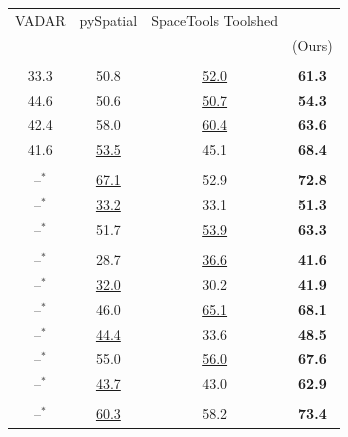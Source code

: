 \begin{table}[t]
{  \begin{tabular}[t]{cccc}
  \toprule
  \rowcolor{white}VADAR                       & pySpatial                & SpaceTools Toolshed                          & \ours{} \\
  \rowcolor{white}\citep{marsili2025visual}   & \citep{luo2026pyspatial} & \citep{chen2025spacetools} & (Ours)  \\
  \midrule
  \multicolumn{4}{c}{\strut} \\
  33.3 & 50.8 & \cellcolor{secondcell}\underline{52.0} & \cellcolor{bestcell}\textbf{61.3} \\
  44.6 & 50.6 & \cellcolor{secondcell}\underline{50.7} & \cellcolor{bestcell}\textbf{54.3} \\
  42.4 & 58.0 & \cellcolor{secondcell}\underline{60.4} & \cellcolor{bestcell}\textbf{63.6} \\
  41.6 & \cellcolor{secondcell}\underline{53.5} & 45.1 & \cellcolor{bestcell}\textbf{68.4} \\
  \midrule
  \multicolumn{4}{c}{\strut} \\
  --$^{*}$ & \cellcolor{secondcell}\underline{67.1} & 52.9 & \cellcolor{bestcell}\textbf{72.8} \\
  --$^{*}$ & \cellcolor{secondcell}\underline{33.2} & 33.1 & \cellcolor{bestcell}\textbf{51.3} \\
  --$^{*}$ & 51.7 & \cellcolor{secondcell}\underline{53.9} & \cellcolor{bestcell}\textbf{63.3} \\
  \midrule
  \multicolumn{4}{c}{\strut} \\
  --$^{*}$ & 28.7 & \cellcolor{secondcell}\underline{36.6} & \cellcolor{bestcell}\textbf{41.6} \\
  --$^{*}$ & \cellcolor{secondcell}\underline{32.0} & 30.2 & \cellcolor{bestcell}\textbf{41.9} \\
  --$^{*}$ & 46.0 & \cellcolor{secondcell}\underline{65.1} & \cellcolor{bestcell}\textbf{68.1} \\
  --$^{*}$ & \cellcolor{secondcell}\underline{44.4} & 33.6 & \cellcolor{bestcell}\textbf{48.5} \\
  --$^{*}$ & 55.0 & \cellcolor{secondcell}\underline{56.0} & \cellcolor{bestcell}\textbf{67.6} \\
  --$^{*}$ & \cellcolor{secondcell}\underline{43.7} & 43.0 & \cellcolor{bestcell}\textbf{62.9} \\
  \midrule
  \multicolumn{4}{c}{\strut} \\
  --$^{*}$ & \cellcolor{secondcell}\underline{60.3} & 58.2 & \cellcolor{bestcell}\textbf{73.4} \\

\end{tabular}}
\end{table}
